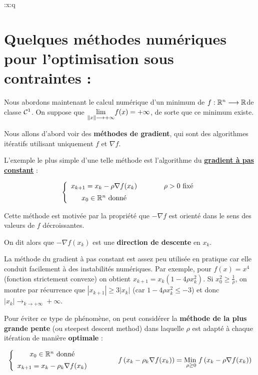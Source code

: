 :x:q

\section{Quelques méthodes numériques pour l'optimisation sous contraintes :}

Nous abordons maintenant le calcul numérique d'un minimum de $f : \mathbb{R}^n \longrightarrow \mathbb{R}$de classe $\mathcal{C}^1$. On suppose que $\underset{\left\lVert x\right\rVert \longrightarrow +\infty}{\lim} f(x) = +\infty$, de sorte que ce minimum existe.

Nous allons d'abord voir des \textbf{méthodes de gradient}, qui sont des
algorithmes itératifs utilisant uniquement $f$ et $\nabla f$.

L'exemple le plus simple d'une telle méthode est l'algorithme du
\underline{\textbf{gradient à pas constant}} :

\[
    \left\lbrace
    \begin{array}{cc}
        x_{k+1} = x_k - \rho \nabla f(x_k) & \hspace{1cm} \rho > 0 \text{ fixé} \\ [5pt]
        x_0 \in \mathbb{R}^n \text{ donné}
    \end{array}
    \right.
\]


Cette méthode est motivée par la propriété que $-\nabla f$ est orienté dans
le sens des valeurs de $f$ décroissantes.

On dit alors que $- \nabla f(x_k)$ est une \textbf{direction de descente} en $x_k$.

La méthode du gradient à pas constant est assez peu utilisée en pratique
car elle conduit facilement à des instabilités numériques. Par exemple,
pour $f(x) = x^4$ (fonction strictement convexe) on obtient $x_{k+1} = x_k(1-4 \rho x_k^2)$. Si $x_0^2 \geq \frac{1}{\rho}$, on montre par récurrence que
$|x_{k+1}| \geq 3 |x_k|$ (car $1-4\rho x_k^2 \leq - 3$) et donc $|x_k| \longrightarrow_{k\to +\infty} + \infty$.

Pour éviter ce type de phénomène, on peut considérer la \textbf{méthode de la
plus grande pente} (ou steepest descent method) dans laquelle $\rho$ est adapté
à chaque itération de manière \textbf{optimale} :

\[
    \begin{array}{cc}
        \left\lbrace
        \begin{array}{c}
            x_0 \in \mathbb{R}^n \text{ donné} \\[5pt]
            x_{k+1} = x_k - \rho_k \nabla f (x_k)
        \end{array}
        \right.
        & \hspace{1cm}
        f\left(x_k - \rho_k \nabla f(x_k)\right) = \underset{\rho \geq 0}{\text{Min }} f \left(x_k - \rho \nabla f(x_k) \right)
    \end{array}
\]

